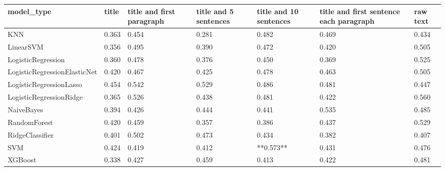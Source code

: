\begin{tabular}{lllllll}
\toprule
                  model\_type & title & title and first paragraph & title and 5 sentences & title and 10 sentences & title and first sentence each paragraph & raw text \\
\midrule
                         KNN & 0.363 &                     0.454 &                 0.281 &                  0.482 &                                   0.469 &    0.434 \\
                   LinearSVM & 0.356 &                     0.495 &                 0.390 &                  0.472 &                                   0.420 &    0.505 \\
          LogisticRegression & 0.360 &                     0.478 &                 0.376 &                  0.450 &                                   0.369 &    0.525 \\
LogisticRegressionElasticNet & 0.420 &                     0.467 &                 0.425 &                  0.478 &                                   0.463 &    0.505 \\
     LogisticRegressionLasso & 0.454 &                     0.542 &                 0.529 &                  0.486 &                                   0.481 &    0.447 \\
     LogisticRegressionRidge & 0.365 &                     0.526 &                 0.438 &                  0.481 &                                   0.422 &    0.560 \\
                  NaiveBayes & 0.394 &                     0.426 &                 0.444 &                  0.441 &                                   0.535 &    0.485 \\
                RandomForest & 0.420 &                     0.459 &                 0.357 &                  0.386 &                                   0.437 &    0.529 \\
             RidgeClassifier & 0.401 &                     0.502 &                 0.473 &                  0.434 &                                   0.382 &    0.407 \\
                         SVM & 0.424 &                     0.419 &                 0.412 &              **0.573** &                                   0.431 &    0.476 \\
                     XGBoost & 0.338 &                     0.427 &                 0.459 &                  0.413 &                                   0.422 &    0.481 \\
\bottomrule
\end{tabular}
